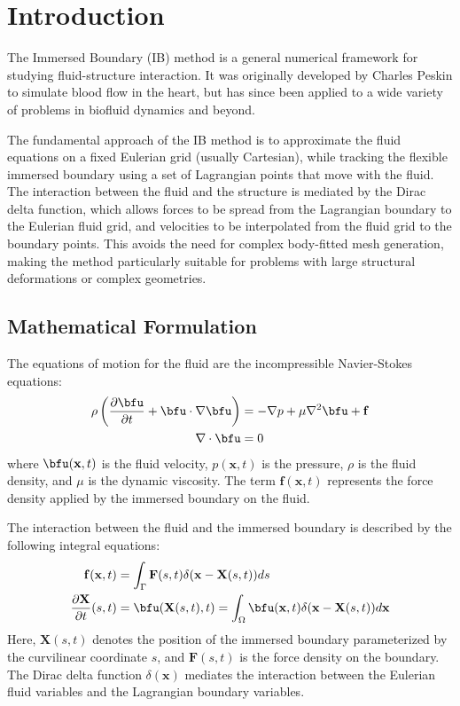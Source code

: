 \documentclass[../Immersed_Boundary_Method.tex]{subfiles}
\begin{document}
\section{Introduction}

The Immersed Boundary (IB) method is a general numerical framework for studying fluid-structure interaction. It was originally developed by Charles Peskin to simulate blood flow in the heart, but has since been applied to a wide variety of problems in biofluid dynamics and beyond.

The fundamental approach of the IB method is to approximate the fluid equations on a fixed Eulerian grid (usually Cartesian), while tracking the flexible immersed boundary using a set of Lagrangian points that move with the fluid. The interaction between the fluid and the structure is mediated by the Dirac delta function, which allows forces to be spread from the Lagrangian boundary to the Eulerian fluid grid, and velocities to be interpolated from the fluid grid to the boundary points. This avoids the need for complex body-fitted mesh generation, making the method particularly suitable for problems with large structural deformations or complex geometries.



\subsection{Mathematical Formulation}

The equations of motion for the fluid are the incompressible Navier-Stokes equations:
\begin{align}
    \rho \left( \frac{\partial \bfu}{\partial t} + \bfu \cdot \nabla \bfu \right) &= -\nabla p + \mu \nabla^2 \bfu + \mathbf{f} \\
    \nabla \cdot \bfu &= 0
\end{align}
where $\bfu(\mathbf{x}, t)$ is the fluid velocity, $p(\mathbf{x}, t)$ is the pressure, $\rho$ is the fluid density, and $\mu$ is the dynamic viscosity. The term $\mathbf{f}(\mathbf{x}, t)$ represents the force density applied by the immersed boundary on the fluid.

The interaction between the fluid and the immersed boundary is described by the following integral equations:
\begin{align}
    \mathbf{f}(\mathbf{x}, t) &= \int_{\Gamma} \mathbf{F}(s, t) \delta(\mathbf{x} - \mathbf{X}(s, t)) ds \\
    \frac{\partial \mathbf{X}}{\partial t}(s, t) &= \bfu(\mathbf{X}(s, t), t) = \int_{\Omega} \bfu(\mathbf{x}, t) \delta(\mathbf{x} - \mathbf{X}(s, t)) d\mathbf{x}
\end{align}
Here, $\mathbf{X}(s, t)$ denotes the position of the immersed boundary parameterized by the curvilinear coordinate $s$, and $\mathbf{F}(s, t)$ is the force density on the boundary. The Dirac delta function $\delta(\mathbf{x})$ mediates the interaction between the Eulerian fluid variables and the Lagrangian boundary variables.
\end{document}
